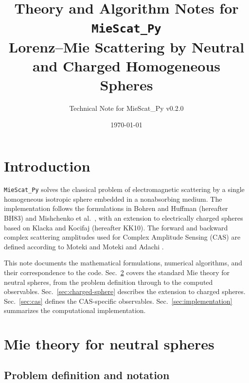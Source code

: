 \documentclass[a4paper,11pt]{article}
\title{Theory and Algorithm Notes for \texttt{MieScat\_Py}\\
\large Lorenz--Mie Scattering by Neutral and Charged Homogeneous Spheres}
\author{Technical Note for MieScat\_Py v0.2.0}
\date{\today}
\begin{document}
\maketitle
\tableofcontents
\newpage

\section{Introduction}
\label{sec:introduction}

\texttt{MieScat\_Py} solves the classical problem of electromagnetic scattering
by a single homogeneous isotropic sphere embedded in a nonabsorbing medium.
The implementation follows the formulations in Bohren and Huffman
\cite{bohren1983} (hereafter BH83) and Mishchenko et al.\ \cite{mishchenko2002},
with an extension to electrically charged spheres based on Klacka and Kocifaj
\cite{klacka2010} (hereafter KK10).  The forward and backward complex
scattering amplitudes used for Complex Amplitude Sensing (CAS) are defined
according to Moteki \cite{moteki2021} and Moteki and Adachi \cite{moteki2024}.

This note documents the mathematical formulations, numerical algorithms, and
their correspondence to the code.  Sec.~\ref{sec:mie-theory} covers the
standard Mie theory for neutral spheres, from the problem definition through to
the computed observables.  Sec.~\ref{sec:charged-sphere} describes the
extension to charged spheres.  Sec.~\ref{sec:cas} defines the CAS-specific
observables.  Sec.~\ref{sec:implementation} summarizes the computational
implementation.


\section{Mie theory for neutral spheres}
\label{sec:mie-theory}

\subsection{Problem definition and notation}
\label{sec:problem-definition}
\end{document}
